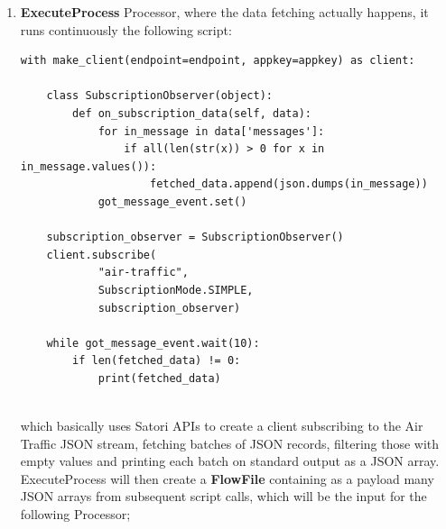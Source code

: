 \begin{enumerate}
    \item \textbf{ExecuteProcess} Processor, where the data fetching actually happens, it runs continuously the following script:
    
    \begin{code}
        \begin{verbatim}
with make_client(endpoint=endpoint, appkey=appkey) as client:
    
    class SubscriptionObserver(object):
        def on_subscription_data(self, data):
            for in_message in data['messages']:
                if all(len(str(x)) > 0 for x in in_message.values()):
                    fetched_data.append(json.dumps(in_message))
            got_message_event.set()
            
    subscription_observer = SubscriptionObserver()
    client.subscribe(
            "air-traffic",
            SubscriptionMode.SIMPLE,
            subscription_observer)
    
    while got_message_event.wait(10):
        if len(fetched_data) != 0:
            print(fetched_data)
     
        \end{verbatim}
    \end{code}
which basically uses Satori APIs to create a client subscribing to the Air Traffic JSON stream, fetching batches of JSON records, filtering those with empty values and printing each batch on standard output as a JSON array. ExecuteProcess will then create a \textbf{FlowFile} containing as a payload many JSON arrays from subsequent script calls, which will be the input for the following Processor;


\end{enumerate}
